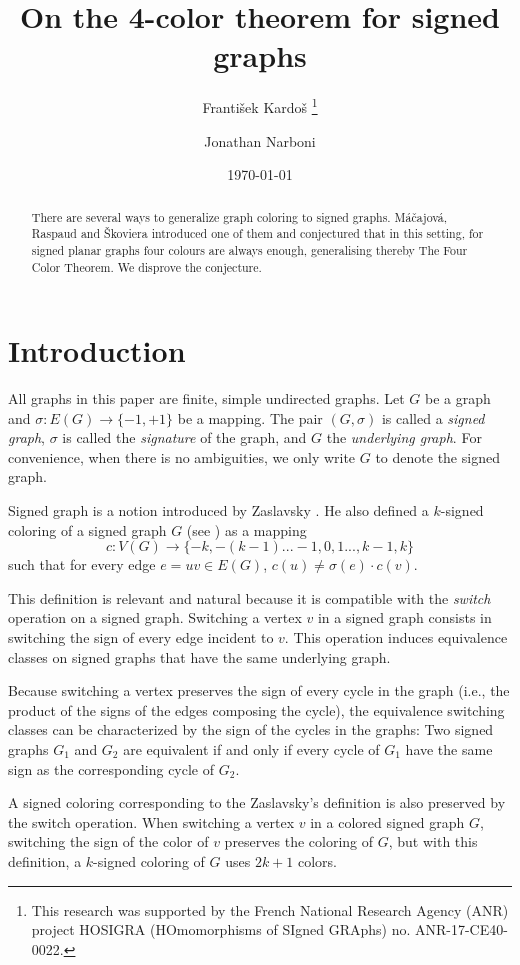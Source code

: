 \documentclass[12pt]{article}
\title{On the 4-color theorem for signed graphs}
\author[1]{Franti\v sek Kardo\v s \footnote{This research was supported by the French National Research Agency (ANR) project HOSIGRA (HOmomorphisms of SIgned GRAphs) no. ANR-17-CE40-0022.}}
\author[1]{Jonathan Narboni}
\affil[1]{Univ. Bordeaux, CNRS,  Bordeaux INP, LaBRI, UMR 5800, F-33400, Talence, France}
\date{\today}
\begin{document}
\maketitle

\begin{abstract}
There are several ways to generalize graph coloring to signed graphs. M\'a\v cajov\'a, Raspaud and \v Skoviera introduced one of them and conjectured that in this setting, for signed planar graphs four colours are always enough, generalising thereby The Four Color Theorem. We disprove the conjecture.
\end{abstract}
\section{Introduction}

All graphs in this paper are finite, simple undirected graphs. Let $G$ be a graph and $\sigma : E(G)\rightarrow \{-1,+1\}$ be a mapping. The pair $(G,\sigma)$ is called a \emph{signed graph}, $\sigma$ is called the \emph{signature} of the graph, and $G$ the \emph{underlying graph}. For convenience, when there is no ambiguities, we only write $G$ to denote the signed graph.

Signed graph is a notion introduced by Zaslavsky \cite{zaslavsky1982signed}. He also defined a $k$-signed coloring of a signed graph $G$ (see \cite{Z82}) as a mapping $$c:V(G)\rightarrow\{-k,-(k-1)...-1,0,1...,k-1,k\}$$ such that for every edge $e=uv\in E(G)$, $c(u)\neq\sigma(e)\cdot c(v)$. 

This definition is relevant and natural because it is compatible with the \emph{switch} operation on a signed graph. Switching a vertex $v$ in a signed graph consists in switching the sign of every edge incident to $v$. This operation induces equivalence classes on signed graphs that have the same underlying graph.

Because switching a vertex preserves the sign of every cycle in the graph (i.e., the product of the signs of the edges composing the cycle), the equivalence switching classes can be characterized by the sign of the cycles in the graphs: Two signed graphs $G_1$ and $G_2$ are equivalent if and only if every cycle of $G_1$ have the same sign as the corresponding cycle of $G_2$. 

A signed coloring corresponding to the Zaslavsky's definition is also preserved by the switch operation. When switching a vertex $v$ in a colored signed graph $G$, switching the sign of the color of $v$ preserves the coloring of $G$, but with this definition, a $k$-signed coloring of $G$ uses $2k+1$ colors.
\end{document}
